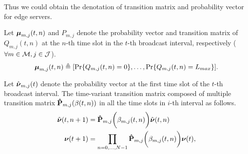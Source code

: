 Thus we could obtain the denotation of transition matrix and probability vector for edge servers.
\begin{definition}
    Let $\boldsymbol{\mu}_{m,j}(t,n)$ and $P_{m,j}$ denote the probability vector and transition matrix of $Q_{m,j}(t,n)$ at the $n$-th time slot in the $t$-th broadcast interval, respectively ($\forall m\in\mathcal{M}, j\in\mathcal{J}$).
    \begin{align}
        \boldsymbol{\mu}_{m,j}(t,n) \triangleq [\Pr\{Q_{m,j}(t,n)=0\}, \dots, \Pr\{Q_{m,j}(t,n)=L_{max}\}].
    \end{align}

    Let $\hat{\boldsymbol{\nu}}_{m,j}(t)$ denote the probability vector at the first time slot of the $t$-th broadcast interval.
    The time-variant transition matrix composed of multiple transition matrix $\mathbf{\hat{P}}_{m,j}(\beta({t,n}))$ in all the time slots in $i$-th interval as follows.
    \begin{align}
        \hat{\boldsymbol{\nu}}({t,n+1}) &= \mathbf{\hat{P}}_{m,j}\bigg(\beta_{m,j}({t,n})\bigg) \hat{\boldsymbol{\nu}}({t,n})
        \\
        \boldsymbol{\nu}(t+1) &= \prod_{n=0,\dots,N-1} \mathbf{\hat{P}}_{m,j}\bigg(\beta_{m,j}({t,n})\bigg) \boldsymbol{\nu}(t),
        \label{eqn_4}
    \end{align}
\end{definition}
